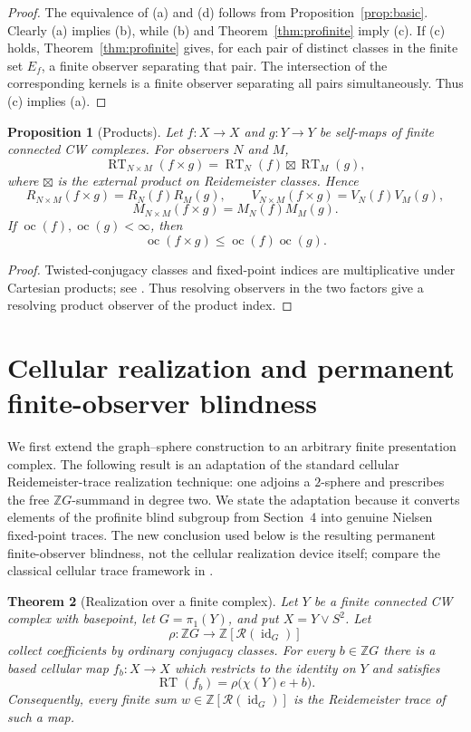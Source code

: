 \documentclass[11pt]{article}
\newtheorem{theorem}{Theorem}[section]
\newtheorem{proposition}[theorem]{Proposition}
\DeclareMathOperator{\oc}{oc}
\DeclareMathOperator{\id}{id}
\newcommand{\RT}{\operatorname{RT}}
\newcommand{\RN}{\mathcal R}
\newcommand{\Z}{\mathbb Z}
\begin{document}
\begin{proof}
The equivalence of (a) and (d) follows from Proposition~\ref{prop:basic}.
Clearly (a) implies (b), while (b) and Theorem~\ref{thm:profinite} imply (c).
If (c) holds, Theorem~\ref{thm:profinite} gives, for each pair of distinct
classes in the finite set $E_f$, a finite observer separating that pair.  The
intersection of the corresponding kernels is a finite observer separating
all pairs simultaneously.  Thus (c) implies (a).
\end{proof}


\begin{proposition}[Products]
\label{prop:product}
Let $f\colon X\to X$ and $g\colon Y\to Y$ be self-maps of finite connected
CW complexes.  For observers $N$ and $M$,
\[
  \RT_{N\times M}(f\times g)=\RT_N(f)\boxtimes\RT_M(g),
\]
where $\boxtimes$ is the external product on Reidemeister classes.  Hence
\[
  R_{N\times M}(f\times g)=R_N(f)R_M(g),\qquad
  V_{N\times M}(f\times g)=V_N(f)V_M(g),
\]
\[
  M_{N\times M}(f\times g)=M_N(f)M_M(g).
\]
If $\oc(f),\oc(g)<\infty$, then
\[
  \oc(f\times g)\le\oc(f)\oc(g).
\]
\end{proposition}

\begin{proof}
Twisted-conjugacy classes and fixed-point indices are multiplicative under
Cartesian products; see \cite{Jiang}.  Thus resolving observers in the two
factors give a resolving product observer of the product index.
\end{proof}

\section{Cellular realization and permanent finite-observer blindness}

We first extend the graph--sphere construction to an arbitrary finite
presentation complex.  The following result is an adaptation of the standard
cellular Reidemeister-trace realization technique: one adjoins a $2$-sphere
and prescribes the free $\Z G$-summand in degree two.  We state the adaptation
because it converts elements of the profinite blind subgroup from Section~4
into genuine Nielsen fixed-point traces.  The new conclusion used below is
the resulting permanent finite-observer blindness, not the cellular
realization device itself; compare the classical cellular trace framework in
\cite{Jiang,Staecker}.

\begin{theorem}[Realization over a finite complex]
\label{thm:generalrealization}
Let $Y$ be a finite connected CW complex with basepoint, let
$G=\pi_1(Y)$, and put $X=Y\vee S^2$.  Let
\[
  \rho\colon\Z G\longrightarrow\Z[\RN(\id_G)]
\]
collect coefficients by ordinary conjugacy classes.  For every $b\in\Z G$
there is a based cellular map $f_b\colon X\to X$ which restricts to the
identity on $Y$ and satisfies
\[
  \RT(f_b)=\rho\bigl(\chi(Y)e+b\bigr).
\]
Consequently, every finite sum
$w\in\Z[\RN(\id_G)]$ is the Reidemeister trace of such a map.
\end{theorem}
\end{document}
